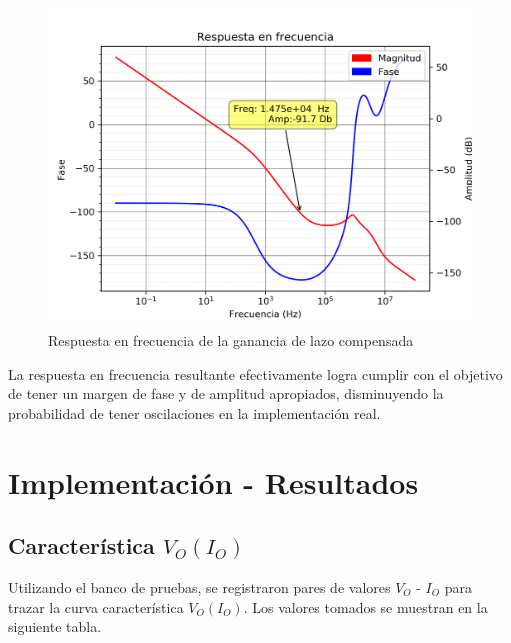\begin{figure}[!ht]
\begin{centering}
\includegraphics[scale=0.58]{Imagenes/Fuente_ConComp.png}
\par\end{centering}
\caption{Respuesta en frecuencia de la ganancia de lazo compensada}

\end{figure}

La respuesta en frecuencia resultante efectivamente logra cumplir con el objetivo de tener un margen de fase y de amplitud apropiados, disminuyendo la probabilidad de tener oscilaciones en la implementaci\'on real.

\newpage

\section{Implementaci\'on - Resultados}

\subsection{Caracter\'istica $V_O(I_O)$}

Utilizando el banco de pruebas, se registraron pares de valores $V_O$ - $I_O$ para trazar la curva caracter\'istica $V_O(I_O)$. Los valores tomados se muestran en la siguiente tabla.

